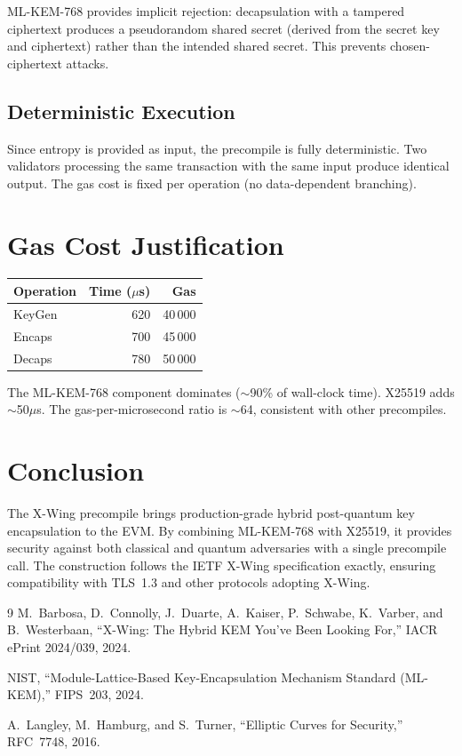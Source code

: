 \documentclass[11pt,a4paper]{article}
\begin{document}
ML-KEM-768 provides implicit rejection: decapsulation with a tampered ciphertext
produces a pseudorandom shared secret (derived from the secret key and ciphertext)
rather than the intended shared secret. This prevents chosen-ciphertext attacks.

\subsection{Deterministic Execution}

Since entropy is provided as input, the precompile is fully deterministic.
Two validators processing the same transaction with the same input produce
identical output. The gas cost is fixed per operation (no data-dependent branching).

\section{Gas Cost Justification}

\begin{table}[H]
\centering
\begin{tabular}{lrr}
\toprule
\textbf{Operation} & \textbf{Time ($\mu$s)} & \textbf{Gas} \\
\midrule
KeyGen & 620 & 40\,000 \\
Encaps & 700 & 45\,000 \\
Decaps & 780 & 50\,000 \\
\bottomrule
\end{tabular}
\end{table}

The ML-KEM-768 component dominates ($\sim$90\% of wall-clock time). X25519
adds $\sim$50$\mu$s. The gas-per-microsecond ratio is $\sim$64, consistent
with other precompiles.

\section{Conclusion}

The X-Wing precompile brings production-grade hybrid post-quantum key
encapsulation to the EVM. By combining ML-KEM-768 with X25519, it provides
security against both classical and quantum adversaries with a single precompile
call. The construction follows the IETF X-Wing specification exactly, ensuring
compatibility with TLS~1.3 and other protocols adopting X-Wing.

\begin{thebibliography}{9}
  M.~Barbosa, D.~Connolly, J.~Duarte, A.~Kaiser, P.~Schwabe, K.~Varber,
  and B.~Westerbaan, ``X-Wing: The Hybrid KEM You've Been Looking For,''
  IACR ePrint 2024/039, 2024.

  NIST, ``Module-Lattice-Based Key-Encapsulation Mechanism Standard (ML-KEM),''
  FIPS~203, 2024.

  A.~Langley, M.~Hamburg, and S.~Turner, ``Elliptic Curves for Security,''
  RFC~7748, 2016.
\end{thebibliography}
\end{document}
